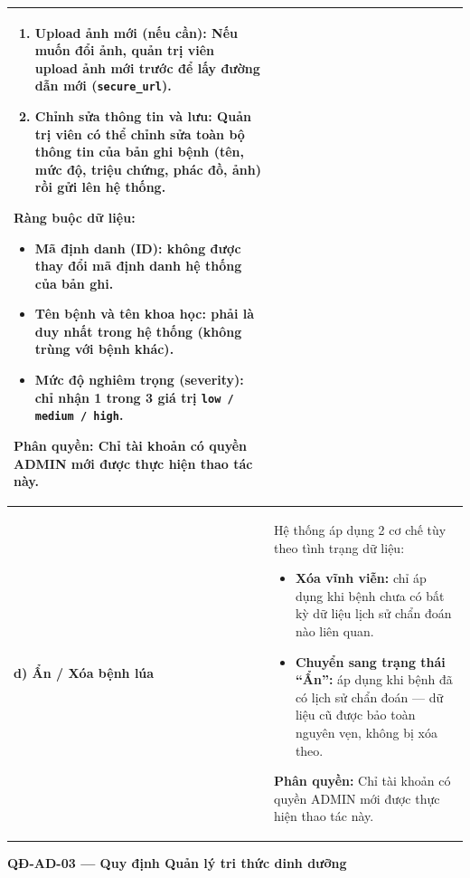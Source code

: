 \documentclass[12pt,a4paper]{article}
\begin{document}
\begin{longtable}{|
        >{\raggedright\arraybackslash}p{2.8cm}|
        >{\raggedright\arraybackslash}p{12cm}|}
\begin{enumerate}[leftmargin=*,topsep=2pt,itemsep=1pt]
        \item \textbf{Upload ảnh mới (nếu cần):} Nếu muốn đổi ảnh, quản trị viên upload ảnh mới trước để lấy đường dẫn mới (\texttt{secure\_url}).
        \item \textbf{Chỉnh sửa thông tin và lưu:} Quản trị viên có thể chỉnh sửa toàn bộ thông tin của bản ghi bệnh (tên, mức độ, triệu chứng, phác đồ, ảnh) rồi gửi lên hệ thống.
    \end{enumerate}
    \textbf{Ràng buộc dữ liệu:}
    \begin{itemize}[leftmargin=*,topsep=2pt,itemsep=1pt]
        \item \textbf{Mã định danh (ID):} không được thay đổi mã định danh hệ thống của bản ghi.
        \item \textbf{Tên bệnh và tên khoa học:} phải là duy nhất trong hệ thống (không trùng với bệnh khác).
        \item \textbf{Mức độ nghiêm trọng (severity):} chỉ nhận 1 trong 3 giá trị \texttt{low / medium / high}.
    \end{itemize}
    \textbf{Phân quyền:} Chỉ tài khoản có quyền ADMIN mới được thực hiện thao tác này.                                                                      \\
    \hline
    \textbf{d) Ẩn / Xóa bệnh lúa}      &
    Hệ thống áp dụng 2 cơ chế tùy theo tình trạng dữ liệu:
    \begin{itemize}[leftmargin=*,topsep=2pt,itemsep=1pt]
        \item \textbf{Xóa vĩnh viễn:} chỉ áp dụng khi bệnh chưa có bất kỳ dữ liệu lịch sử chẩn đoán nào liên quan.
        \item \textbf{Chuyển sang trạng thái ``Ẩn'':} áp dụng khi bệnh đã có lịch sử chẩn đoán --- dữ liệu cũ được bảo toàn nguyên vẹn, không bị xóa theo.
    \end{itemize}
    \textbf{Phân quyền:} Chỉ tài khoản có quyền ADMIN mới được thực hiện thao tác này.                                                                      \\
    \hline
\end{longtable}

\vspace{0.3cm}
\noindent\textbf{QĐ-AD-03 --- Quy định Quản lý tri thức dinh dưỡng}
\end{document}
